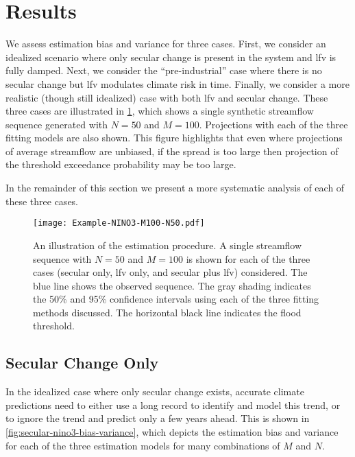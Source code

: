 \documentclass[
  draft,
  linenumbers
]{agujournal2018}
\begin{document}
\section{Results}\label{sec:results}

We assess estimation bias and variance for three cases.
First, we consider an idealized scenario where only secular change is present in the system and \gls{lfv} is fully damped.
Next, we consider the ``pre-industrial'' case where there is no secular change but \gls{lfv} modulates climate risk in time.
Finally, we consider a more realistic (though still idealized) case with both \gls{lfv} and secular change.
These three cases are illustrated in \cref{fig:example-fit}, which shows a single synthetic streamflow sequence generated with $N=50$ and $M=100$.
Projections with each of the three fitting models are also shown.
This figure highlights that even where projections of average streamflow are unbiased, if the spread is too large then projection of the threshold exceedance probability may be too large.

In the remainder of this section we present a more systematic analysis of each of these three cases.
\begin{figure}
  \texttt{[image: Example-NINO3-M100-N50.pdf]}
  \caption{
    An illustration of the estimation procedure.
    A single streamflow sequence with $N=50$ and $M=100$ is shown for each of the three cases (secular only, \gls{lfv} only, and secular plus \gls{lfv}) considered.
    The blue line shows the observed sequence.
    The gray shading indicates the 50\% and 95\% confidence intervals using each of the three fitting methods discussed.
    The horizontal black line indicates the flood threshold.
  }\label{fig:example-fit}
\end{figure}

\subsection{Secular Change Only}

In the idealized case where only secular change exists, accurate climate predictions need to either use a long record to identify and model this trend, or to ignore the trend and predict only a few years ahead.
This is shown in \cref{fig:secular-nino3-bias-variance}, which depicts the estimation bias and variance for each of the three estimation models for many combinations of $M$ and $N$.
\end{document}
